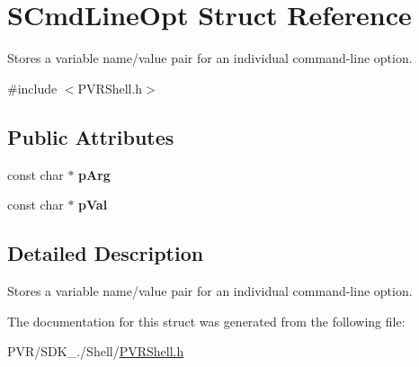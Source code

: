 \hypertarget{struct_s_cmd_line_opt}{\section{S\+Cmd\+Line\+Opt Struct Reference}
\label{struct_s_cmd_line_opt}
}


Stores a variable name/value pair for an individual command-\/line option.  




{\ttfamily \#include $<$P\+V\+R\+Shell.\+h$>$}

\subsection*{Public Attributes}
\begin{DoxyCompactItemize}
\item 
\hypertarget{struct_s_cmd_line_opt_a6188fb32c38995d8621985b7b8eaa6ea}{const char $\ast$ {\bfseries p\+Arg}}\label{struct_s_cmd_line_opt_a6188fb32c38995d8621985b7b8eaa6ea}

\item 
\hypertarget{struct_s_cmd_line_opt_a06dcbd79eebb9860996328f26c931f64}{const char $\ast$ {\bfseries p\+Val}}\label{struct_s_cmd_line_opt_a06dcbd79eebb9860996328f26c931f64}

\end{DoxyCompactItemize}


\subsection{Detailed Description}
Stores a variable name/value pair for an individual command-\/line option. 



 

The documentation for this struct was generated from the following file\+:\begin{DoxyCompactItemize}
\item 
P\+V\+R/\+S\+D\+K\+\_./\+Shell/\hyperlink{_p_v_r_shell_8h}{P\+V\+R\+Shell.\+h}\end{DoxyCompactItemize}
